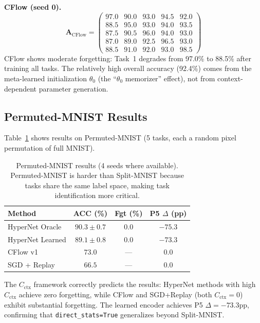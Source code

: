 \documentclass{article}
\begin{document}
\textbf{CFlow (seed 0).}
\begin{equation*}
\mathbf{A}_\mathrm{CFlow} = \begin{pmatrix}
97.0 & 90.0 & 93.0 & 94.5 & 92.0 \\
88.5 & 95.0 & 93.0 & 94.0 & 93.5 \\
87.5 & 90.5 & 96.0 & 94.0 & 93.0 \\
87.0 & 89.0 & 92.5 & 96.5 & 93.0 \\
88.5 & 91.0 & 92.0 & 93.0 & 98.5
\end{pmatrix}
\end{equation*}
CFlow shows moderate forgetting: Task~1 degrades from 97.0\% to 88.5\% after training all tasks. The relatively high overall accuracy (92.4\%) comes from the meta-learned initialization $\theta_0$ (the ``$\theta_0$ memorizer'' effect), not from context-dependent parameter generation.


\subsection{Permuted-MNIST Results}
\label{app:permuted}

Table~\ref{tab:permuted} shows results on Permuted-MNIST (5 tasks, each a random pixel permutation of full MNIST).

\begin{table}[h]
\centering
\caption{Permuted-MNIST results (4 seeds where available). Permuted-MNIST is harder than Split-MNIST because tasks share the same label space, making task identification more critical.}
\label{tab:permuted}
\small
\begin{tabular}{lccc}
\toprule
Method & ACC (\%) & Fgt (\%) & P5 $\Delta$ (pp) \\
\midrule
HyperNet Oracle    & $90.3 \pm 0.7$ & $0.0$ & $-75.3$ \\
HyperNet Learned   & $89.1 \pm 0.8$ & $0.0$ & $-73.3$ \\
CFlow v1           & $73.0$          & ---   & $0.0$ \\
SGD + Replay       & $66.5$          & ---   & $0.0$ \\
\bottomrule
\end{tabular}
\end{table}

The $C_\mathrm{ctx}$ framework correctly predicts the results: HyperNet methods with high $C_\mathrm{ctx}$ achieve zero forgetting, while CFlow and SGD+Replay (both $C_\mathrm{ctx} = 0$) exhibit substantial forgetting. The learned encoder achieves P5 $\Delta = -73.3$pp, confirming that \texttt{direct\_stats=True} generalizes beyond Split-MNIST.
\end{document}
